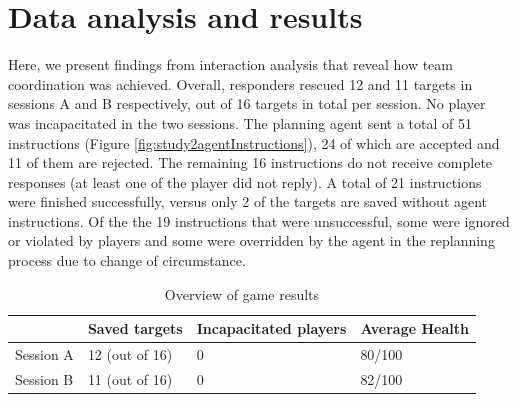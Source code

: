 
\section{Data analysis and results}\label{sec:study2analysis}
Here, we present findings from interaction analysis that reveal how team coordination was achieved. Overall, responders rescued 12 and 11 targets in sessions A and B respectively, out of 16 targets in total per session. No player was incapacitated in the two sessions. The planning agent sent a total of 51 instructions (Figure \ref{fig:study2agentInstructions}), 24 of which are accepted and 11 of them are rejected. The remaining 16 instructions do not receive complete responses (at least one of the player did not reply). A total of 21 instructions were finished successfully, versus only 2 of the targets are saved without agent instructions. Of the the 19 instructions that were unsuccessful, some were ignored or violated by players and some were overridden by the agent in the replanning process due to change of circumstance.\\

\begin{table}[h]
\footnotesize
\begin{tabular}{llll}
\multicolumn{1}{l|}{} & Saved targets & Incapacitated players & Average Health \\ \hline
\multicolumn{1}{l|}{Session A} & 12 (out of 16) & 0                    & 80/100             \\ 
\multicolumn{1}{l|}{Session B} & 11 (out of 16) & 0                    & 82/100             \\ 
\end{tabular}
\caption{Overview of game results}
\label{tab:gameResults1}
\end{table}

